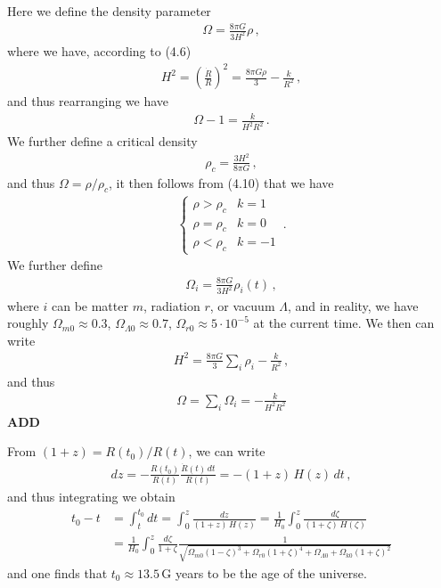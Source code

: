 \documentclass[11pt, onesided]{book}
\theoremstyle{break}
\theoremstyle{break}
\begin{document}
Here we define the density parameter
\begin{align*}
\Omega = \frac{8\pi G}{3H^2} \rho\,,
\end{align*}
where we have, according to (4.6)
\begin{align*}
H^2 = \left( \frac{\dot{R}}{R}\right)^2 = \frac{8\pi G\rho}{3} - \frac{k}{R^2}\,,
\end{align*}
and thus rearranging we have
\begin{align}
\Omega-1 =  \frac{k}{H^2 R^2}\,.
\end{align}
We further define a critical density
\begin{align*}
\rho_c = \frac{3H^2}{8\pi G}\,,
\end{align*}
and thus $\Omega = \rho/ \rho_c$,  it then follows from (4.10) that we have
\begin{align*}
\begin{cases}
\rho > \rho_c & k=1\\
\rho = \rho_c & k=0\\
\rho < \rho_c & k=-1
\end{cases}\,.
\end{align*}
We further define
\begin{align*}
\Omega_i = \frac{8\pi G}{3H^2}\rho_i(t)\,,
\end{align*}
where $i$ can be matter $m$, radiation $r$, or vacuum $\Lambda$, and in reality, we have roughly $\Omega_{m0} \approx 0.3$, $\Omega_{\Lambda0} \approx 0.7$, $\Omega_{r0} \approx 5\cdot 10^{-5}$ at the 
current time. We then can write
\begin{align*}
H^2 = \frac{8\pi G}{3}\sum_i \rho_i - \frac{k}{R^2}\,,
\end{align*}
and thus
\begin{align*}
\Omega= \sum_{i}\Omega_i = -\frac{k}{H^2R^2} 
\end{align*}
\textbf{ADD}

From $(1+z) = R(t_0)/R(t)$, we can write
\begin{align*}
dz = -\frac{R(t_0)}{R(t)} \frac{\dot{R}(t)\, dt}{R(t)} = -(1+z) \, H(z) \, dt\,,
\end{align*}
and thus integrating we obtain
\begin{align*}
t_0-t
&= \int_{t}^{t_0}dt = \int_0^z \frac{dz}{(1+z) \, H(z)} = \frac{1}{H_0}\int_0^z \frac{d\zeta}{(1+\zeta) \, H(\zeta)}\\
&= \frac{1}{H_0}\int_0^z \frac{d\zeta}{1+\zeta} \frac{1}{\sqrt{\Omega_{m0}(1-\zeta)^3 + \Omega_{r0}(1+\zeta)^4 + \Omega_{\Lambda0} + \Omega_{k0}(1+\zeta)^2}}
\end{align*}
and one finds that $t_0 \approx 13.5\,$G years to be the age of the universe. 
\end{document}
